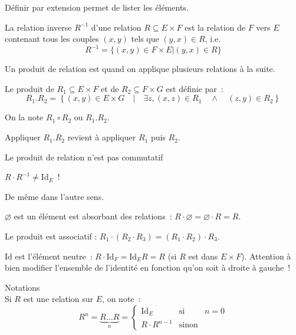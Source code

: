 \documentclass[a4paper, titlepage]{article}
\newenvironment{lititle}%
{\vspace{7mm}\LobsterTwo \large}%
{\\}
\begin{document}
    Définir par extension permet de lister les éléments.
    \begin{defn}
        La relation inverse $R^{-1}$ d'une relation $R\subseteq E\times F$ est la relation de $F$ vers $E$ contenant
        tous les couples $(x,y)$ tels que $(y,x)\in R$, i.e.
        $$ R^{-1} = \{(x,y)\in F\times E|(y,x)\in R\} $$
    \end{defn}
    \begin{defn}
        Un produit de relation est quand on applique plusieurs relations à la suite.

        Le produit de $R_1\subseteq E\times F$ et de $R_2\subseteq F\times G$ est définie par~:
        $$ R_1.R_2 = \left\{(x,y)\in E\times G\quad|\quad\exists z, (x,z)\in R_1\quad\land\quad(z,y)\in R_2\right\} $$

        On la note $R_1\circ R_2$ ou $R_1.R_2$.
    \end{defn}
    Appliquer $R_1.R_2$ revient à appliquer $R_1$ puis $R_2$.
    \begin{warn}
        Le produit de relation n'est pas commutatif
    \end{warn}
    \begin{warn}
        $R\cdot R^{-1}\neq\mathrm{Id}_E$~!

        De même dans l'autre sens.
    \end{warn}
    \begin{props}[Propriétés]
        $\varnothing$ est un élément est absorbant des relations~: $R\cdot\varnothing = \varnothing\cdot R = R$.

        Le produit est associatif : $R_1\cdot(R_2\cdot R_3) = (R_1\cdot R_2)\cdot R_3$.

        $\mathrm{Id}$ est l'élément neutre~: $R\cdot\mathrm{Id}_F = \mathrm{Id}_ER=R$ (si $R$ est dans $E\times F$).
        Attention à bien modifier l'ensemble de l'identité en fonction qu'on soit à droite à gauche~!
    \end{props}
    \begin{lititle}
        Notations
    \end{lititle}
    Si $R$ est une relation sur $E$, on note~:
    $$ R^n = \underbrace{R\ldots R}_n = \left\{\begin{matrix}
    	\mathrm{Id}_E&\text{si}&n=0\\
	    R\cdot R^{n-1}&\text{sinon}
    \end{matrix}\right. $$
\end{document}
